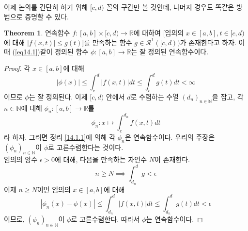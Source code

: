 \documentclass[11pt]{book}
\numberwithin{equation}{chapter}
\def\NN{\mathbb{N}}
\def\RR{\mathbb{R}}
\def\eps{\epsilon}
\def\calR{\mathcal{R}}
\newcommand{\abs}[1]{\left\vert#1\right\vert}
\theoremstyle{definition}
\newtheorem{thm}{Theorem}[section]
\begin{document}
이제 논의를 간단히 하기 위해 \([c, d)\) 꼴의 구간만 볼 것인데, 나머지 경우도 똑같은 방법으로 증명할 수 있다.

\begin{thm} \label{14.1.3}
    연속함수 \(f : [a, b] \times [c, d) \to \RR\)에 대하여 [임의의 \(x \in [a, b], t \in [c, d)\)에 대해 \(\abs{f(x, t)} \le g(t)\)]를 만족하는 함수 \(g \in \calR^1([c, d))\)가 존재한다고 하자. 이때 (\ref{eq14.1})\과 같이 정의된 함수 \(\phi : [a, b] \to \RR\)는 잘 정의된 연속함수이다.
\end{thm}
\begin{proof}
    각 \(x \in [a, b]\)에 대해
    \[
       \abs{\phi(x)}  \le \int_c^d \abs{f(x, t)} dt \le \int_c^d g(t) dt < \infty
    \]
    이므로 \(\phi\)는 잘 정의된다. 이제 \([c, d)\) 안에서 \(d\)로 수렴하는 수열 \((d_n)_{n \in \NN}\)을 잡고, 각 \(n \in \NN\)에 대해 \(\phi_n : [a, b] \to \RR\)를
    \begin{equation} \label{eq14.3}
        \phi_n : x \mapsto \int_c^{d_n} f(x, t) dt  
    \end{equation}
    라 하자. 그러면 정리 \ref{14.1.1}에 의해 각 \(\phi_n\)은 연속함수이다. 우리의 주장은 \((\phi_n)_{n \in \NN}\)이 \(\phi\)로 고른수렴한다는 것이다.\\
    임의의 양수 \(\eps > 0\)에 대해, 다음을 만족하는 자연수 \(N\)이 존재한다.
    \[
    n \ge N \implies \int_{d_n}^d g < \eps    
    \]
    이제 \(n \ge N\)이면 임의의 \(x \in [a, b]\)에 대해
    \[
    \abs{\phi_n(x) - \phi(x)} \le \int_{d_n}^d \abs{f(x, t)} dt \le \int_{d_n}^d g(t) dt < \eps
    \]
    이므로, \((\phi_n)_{n \in \NN}\)이 \(\phi\)로 고른수렴한다. 따라서 \(\phi\)는 연속함수이다.
\end{proof}
\end{document}
